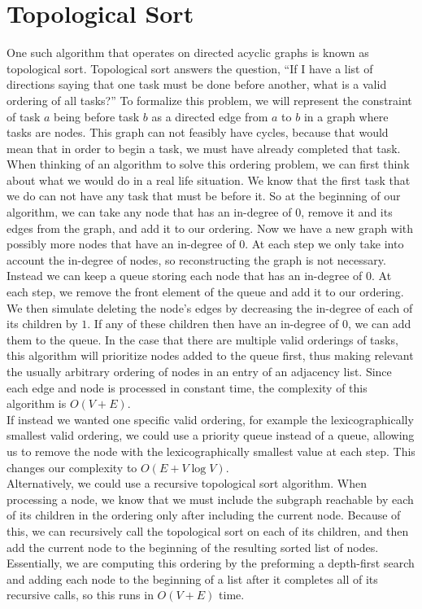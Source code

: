 \documentclass{article}
\begin{document}
\section{Topological Sort}
One such algorithm that operates on directed acyclic graphs is known as topological sort. Topological sort answers the question, ``If I have a list of directions saying that one task must be done before another, what is a valid ordering of all tasks?'' To formalize this problem, we will represent the constraint of task $a$ being before task $b$ as a directed edge from $a$ to $b$ in a graph where tasks are nodes. This graph can not feasibly have cycles, because that would mean that in order to begin a task, we must have already completed that task.
\\
\hfill\break
When thinking of an algorithm to solve this ordering problem, we can first think about what we would do in a real life situation. We know that the first task that we do can not have any task that must be before it. So at the beginning of our algorithm, we can take any node that has an in-degree of $0$, remove it and its edges from the graph, and add it to our ordering. Now we have a new graph with possibly more nodes that have an in-degree of $0$. At each step we only take into account the in-degree of nodes, so reconstructing the graph is not necessary.
\\
\hfill\break
Instead we can keep a queue storing each node that has an in-degree of $0$. At each step, we remove the front element of the queue and add it to our ordering. We then simulate deleting the node's edges by decreasing the in-degree of each of its children by $1$. If any of these children then have an in-degree of $0$, we can add them to the queue. In the case that there are multiple valid orderings of tasks, this algorithm will prioritize nodes added to the queue first, thus making relevant the usually arbitrary ordering of nodes in an entry of an adjacency list. Since each edge and node is processed in constant time, the complexity of this algorithm is $O(V+E)$. 
\\
\hfill\break
If instead we wanted one specific valid ordering, for example the lexicographically smallest valid ordering, we could use a priority queue instead of a queue, allowing us to remove the node with the lexicographically smallest value at each step. This changes our complexity to $O(E+V\log{V})$.
\\
\hfill\break
Alternatively, we could use a recursive topological sort algorithm. When processing a node, we know that we must include the subgraph reachable by each of its children in the ordering only after including the current node. Because of this, we can recursively call the topological sort on each of its children, and then add the current node to the beginning of the resulting sorted list of nodes. Essentially, we are computing this ordering by the preforming a depth-first search and adding each node to the beginning of a list after it completes all of its recursive calls, so this runs in $O(V+E)$ time.
\end{document}
